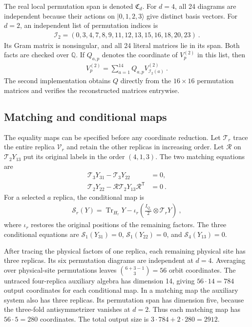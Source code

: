 \documentclass[aps,pra,reprint,superscriptaddress,amsmath,amssymb,floatfix,nofootinbib]{revtex4-2}
\newcommand{\Tr}{\operatorname{Tr}}
\newcommand{\Q}{\mathbb Q}
\begin{document}
The real local permutation span is denoted $\mathfrak C_d$.
For $d=4$, all 24 diagrams are independent because their actions on
$|0,1,2,3\rangle$ give distinct basis vectors.
For $d=2$, an independent list of permutation indices is
\begin{align}
 \mathcal I_2=(0,3,4,7,8,9,11,12,13,15,16,18,20,23)\ .
 \label{eq:auxiliary-basis}
\end{align}
Its Gram matrix is nonsingular, and all 24 literal matrices lie in its
span. Both facts are checked over $\Q$.
If $Q_{a,p}$ denotes the coordinate of $V_p^{(2)}$ in this list, then
\begin{align}
 V_p^{(2)}=\sum_{a=1}^{14}Q_{a,p}V_{\mathcal I_2(a)}^{(2)}\ .
 \label{eq:auxiliary-quotient}
\end{align}
The second implementation obtains $Q$ directly from the $16\times16$
permutation matrices and verifies the reconstructed matrices entrywise.

\subsection{Matching and conditional maps}

The equality maps can be specified before any coordinate reduction.
Let $\mathcal T_r$ trace the entire replica $\mathcal V_r$ and retain
the other replicas in increasing order. Let $\mathcal R$ on
$\mathcal T_2Y_{13}$ put its original labels in the order $(4,1,3)$.
The two matching equations are
\begin{align}
 \mathcal T_3Y_{31}-\mathcal T_3Y_{22}&=0,\nonumber\\
 \mathcal T_2Y_{22}-\mathcal R\mathcal T_2Y_{13}\mathcal R^{\mathsf T}&=0\ .
 \label{eq:matching-equalities}
\end{align}
For a selected $a$ replica, the conditional map is
\begin{align}
 \mathcal S_r(Y)=\Tr_{H_r}Y
 -\iota_r\!\left(\frac{I_{Q_r}}2\otimes\mathcal T_rY\right)\ ,
 \label{eq:conditional-map}
\end{align}
where $\iota_r$ restores the original positions of the remaining factors.
The three conditional equations are
$\mathcal S_1(Y_{31})=0$, $\mathcal S_1(Y_{22})=0$, and
$\mathcal S_4(Y_{13})=0$.

After tracing the physical factors of one replica, each remaining
physical site has three replicas. Its six permutation diagrams are
independent at $d=4$.
Averaging over physical-site permutations leaves
$\binom{6+3-1}{3}=56$ orbit coordinates.
The untraced four-replica auxiliary algebra has dimension 14, giving
$56\cdot14=784$ output coordinates for each conditional map.
In a matching map the auxiliary system also has three replicas.
Its permutation span has dimension five, because the three-fold
antisymmetrizer vanishes at $d=2$. Thus each matching map has
$56\cdot5=280$ coordinates.
The total output size is $3\cdot784+2\cdot280=2912$.
\end{document}
